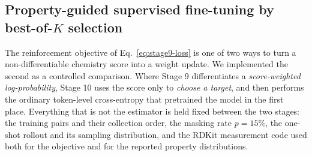%
%   
%   

\subsection*{Property-guided supervised fine-tuning by best-of-$K$ selection}
\label{sec:stage10}

The reinforcement objective of Eq.~\eqref{eq:stage9-loss} is one of two ways to
turn a non-differentiable chemistry score into a weight update. We implemented
the second as a controlled comparison. Where Stage 9 differentiates a
\emph{score-weighted log-probability}, Stage 10 uses the score only to
\emph{choose a target}, and then performs the ordinary token-level
cross-entropy that pretrained the model in the first place. Everything that is
not the estimator is held fixed between the two stages: the training pairs and
their collection order, the masking rate $p=15\%$, the one-shot rollout and its
sampling distribution, and the RDKit measurement code used both for the
objective and for the reported property distributions.

